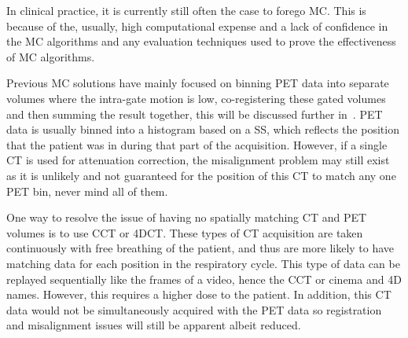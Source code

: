         In clinical practice, it is currently still often the case to forego \gls{MC}. This is because of the, usually, high computational expense and a lack of confidence in the \gls{MC} algorithms and any evaluation techniques used to prove the effectiveness of \gls{MC} algorithms.%
    
        Previous \gls{MC} solutions have mainly focused on binning \gls{PET} data into separate volumes where the intra-gate motion is low, co-registering these gated volumes and then summing the result together, this will be discussed further in~. \gls{PET} data is usually binned into a histogram based on a \gls{SS}, which reflects the position that the patient was in during that part of the acquisition. However, if a single \gls{CT} is used for attenuation correction, the misalignment problem may still exist as it is unlikely and not guaranteed for the position of this \gls{CT} to match any one \gls{PET} bin, never mind all of them.
        
        One way to resolve the issue of having no spatially matching \gls{CT} and \gls{PET} volumes is to use \gls{CCT} or \gls{4DCT}. These types of \gls{CT} acquisition are taken continuously with free breathing of the patient, and thus are more likely to have matching data for each position in the respiratory cycle.  This type of data can be replayed sequentially like the frames of a video, hence the \gls{CCT} or cinema and \gls{4D} names. However, this requires a higher dose to the patient. In addition, this \gls{CT} data would not be simultaneously acquired with the \gls{PET} data so registration and misalignment issues will still be apparent albeit reduced. 
        
